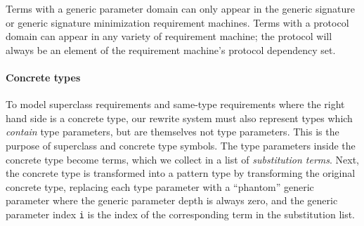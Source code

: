 \documentclass[../generics]{subfiles}
\begin{document}
%
Terms with a generic parameter domain can only appear in the generic signature or generic signature minimization requirement machines. Terms with a protocol domain can appear in any variety of requirement machine; the protocol will always be an element of the requirement machine's protocol dependency set.

\paragraph{Concrete types}
%
%
%
%
%
%
%
To model superclass requirements and same-type requirements where the right hand side is a concrete type, our rewrite system must also represent types which \emph{contain} type parameters, but are themselves not type parameters. This is the purpose of superclass and concrete type symbols. The type parameters inside the concrete type become terms, which we collect in a list of \emph{substitution terms}. Next, the concrete type is transformed into a pattern type by transforming the original concrete type, replacing each type parameter with a ``phantom'' generic parameter  where the generic parameter depth is always zero, and the generic parameter index \texttt{i} is the index of the corresponding term in the substitution list.
\end{document}

